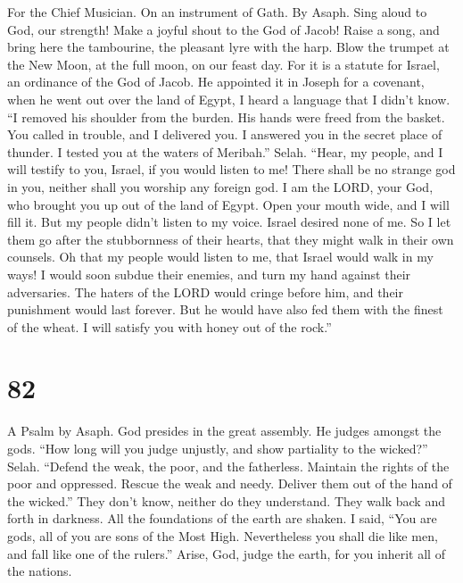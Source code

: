 For the Chief Musician. On an instrument of Gath. By Asaph. 
Sing aloud to God, our strength! Make a joyful shout to the God of
Jacob!  Raise a song, and bring here the tambourine, the
pleasant lyre with the harp.  Blow the trumpet at the New
Moon, at the full moon, on our feast day.  For it is a
statute for Israel, an ordinance of the God of Jacob.  He
appointed it in Joseph for a covenant, when he went out over the land of
Egypt, I heard a language that I didn't know.  ``I removed
his shoulder from the burden. His hands were freed from the basket.
 You called in trouble, and I delivered you. I answered you
in the secret place of thunder. I tested you at the waters of Meribah.''
Selah.  ``Hear, my people, and I will testify to you,
Israel, if you would listen to me!  There shall be no
strange god in you, neither shall you worship any foreign god.
 I am the LORD, your God, who brought you up out of the
land of Egypt. Open your mouth wide, and I will fill it. 
But my people didn't listen to my voice. Israel desired none of me.
 So I let them go after the stubbornness of their hearts,
that they might walk in their own counsels.  Oh that my
people would listen to me, that Israel would walk in my ways!
 I would soon subdue their enemies, and turn my hand
against their adversaries.  The haters of the LORD would
cringe before him, and their punishment would last forever.
 But he would have also fed them with the finest of the
wheat. I will satisfy you with honey out of the rock.''

\hypertarget{section-72}{%
\section{82}\label{section-72}}

A Psalm by Asaph.  God presides in the great assembly. He
judges amongst the gods.  ``How long will you judge
unjustly, and show partiality to the wicked?'' Selah. 
``Defend the weak, the poor, and the fatherless. Maintain the rights of
the poor and oppressed.  Rescue the weak and needy. Deliver
them out of the hand of the wicked.''  They don't know,
neither do they understand. They walk back and forth in darkness. All
the foundations of the earth are shaken.  I said, ``You are
gods, all of you are sons of the Most High.  Nevertheless
you shall die like men, and fall like one of the rulers.'' 
Arise, God, judge the earth, for you inherit all of the nations.

